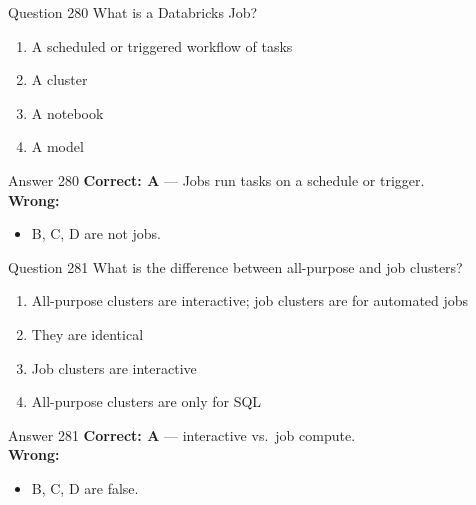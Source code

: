 \documentclass[aspectratio=169,11pt]{beamer}
\begin{document}
	\begin{frame}{Question 280}
		What is a Databricks Job?
		\begin{enumerate}[label=\Alph*.]
			\item A scheduled or triggered workflow of tasks
			\item A cluster
			\item A notebook
			\item A model
		\end{enumerate}
	\end{frame}
	\begin{frame}{Answer 280}
		\textbf{Correct: A} --- Jobs run tasks on a schedule or trigger.\\
		\vspace{0.5em}
		\textbf{Wrong:}
		\begin{itemize}
			\item B, C, D are not jobs.
		\end{itemize}
	\end{frame}
	
	\begin{frame}{Question 281}
		What is the difference between all-purpose and job clusters?
		\begin{enumerate}[label=\Alph*.]
			\item All-purpose clusters are interactive; job clusters are for automated jobs
			\item They are identical
			\item Job clusters are interactive
			\item All-purpose clusters are only for SQL
		\end{enumerate}
	\end{frame}
	\begin{frame}{Answer 281}
		\textbf{Correct: A} --- interactive vs.\ job compute.\\
		\vspace{0.5em}
		\textbf{Wrong:}
		\begin{itemize}
			\item B, C, D are false.
		\end{itemize}
	\end{frame}
	
\end{document}
